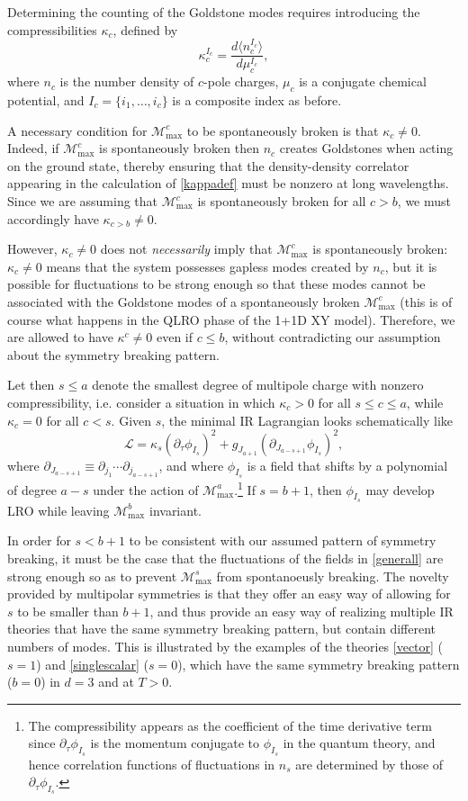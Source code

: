 \documentclass[prb,aps,twocolumn, amsfonts,amsmath,amssymb,nofootinbib,superscriptaddress]{revtex4-2}
\renewcommand{\max}{\text{max}}
\newcommand{\mmax}[1]{\mathcal{M}^{#1}_\max}
\newcommand\be            {\begin{equation}}
\newcommand\ee            {\end{equation}}
\newcommand{\p}{\partial}
\begin{document}
Determining the counting of the Goldstone modes requires introducing the compressibilities $\kappa_c$, defined by 
\be \label{kappadef} \kappa_c^{I_c} = \frac{d\langle n_c^{I_c}\rangle}{d\mu_c^{I_c}},\ee 
where $n_c$ is the number density of $c$-pole charges, $\mu_c$ is a conjugate chemical potential, and $I_c = \{i_1,\dots,i_c\}$ is a composite index as before.

A necessary condition for $\mmax c$ to be spontaneously broken is that $\kappa_c \neq 0$. Indeed, if $\mmax c$ is spontaneously broken then $n_c$ creates Goldstones when acting on the ground state, thereby ensuring that the density-density correlator appearing in the calculation of \eqref{kappadef} must be nonzero at long wavelengths. Since we are assuming that $\mmax c$ is spontaneously broken for all $c>b$, we must accordingly have $\kappa_{c>b} \neq 0$. 

However, $\kappa_c \neq 0$ does not {\it necessarily} imply that $\mmax c$ is spontaneously broken: $\kappa_c\neq 0$ means that the system possesses gapless modes created by $n_c$, but it is possible for fluctuations to be strong enough so that these modes cannot be associated with the Goldstone modes of a spontaneously broken $\mmax c$ (this is of course what happens in the QLRO phase of the 1+1D XY model). Therefore, we are allowed to have $\kappa^c \neq 0$ even if $c \leq b$, without contradicting our assumption about the symmetry breaking pattern. 

Let then $s\leq a$ denote the smallest degree of multipole charge with nonzero compressibility, i.e. consider a situation in which $\kappa_c>0$ for all $s\leq c\leq a$, while $\kappa_c=0$ for all $c<s$. 
Given $s$, the minimal IR Lagrangian looks schematically like 
\be \label{generall} \mathcal{L} = \kappa_s (\partial_\tau \phi_{I_s})^2 + g_{J_{a+1}}(\partial_{J_{a-s+1}}\phi_{I_s})^2,\ee where 
$\p_{J_{a-s+1}} \equiv \p_{j_1} \cdots \p_{j_{a-s+1}}$, and where $\phi_{I_s}$ is a field that shifts by a polynomial of degree $a-s$ under the action of $\mmax a$.\footnote{The compressibility appears as the coefficient of the time derivative term since $\p_\tau \phi_{I_s}$ is the momentum conjugate to $\phi_{I_s}$ in the quantum theory, and hence correlation functions of fluctuations in $n_s$ are determined by those of $\p_\tau \phi_{I_s}$.}  If $s=b+1$, then $\phi_{I_s}$ may develop LRO while leaving $\mmax{b}$ invariant.

In order for $s< b+1$ to be consistent with our assumed pattern of symmetry breaking, it must be the case that the fluctuations of the fields in \eqref{generall} are strong enough so as to prevent $\mmax {s}$ from spontanoeusly breaking. The novelty provided by multipolar symmetries is that they offer an easy way of allowing for $s$ to be smaller than $b+1$, and thus provide an easy way of realizing multiple IR theories that have the same symmetry breaking pattern, but contain different numbers of modes. This is illustrated by the examples of the theories \eqref{vector} ($s=1$) and \eqref{singlescalar} ($s=0$), which have the same symmetry breaking pattern ($b=0$) in $d=3$ and at $T>0$. 
\end{document}
